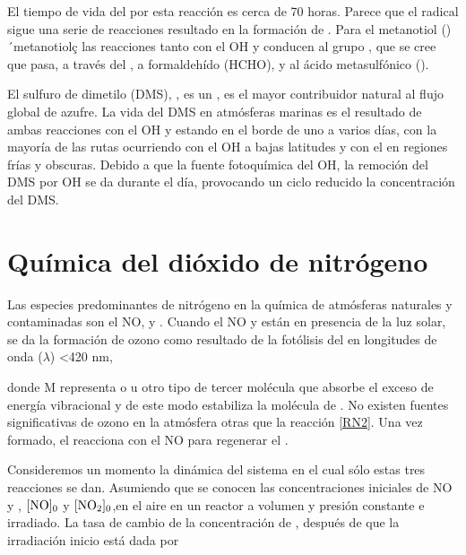 El tiempo de vida del  por esta reacción es cerca de 70 horas. Parece que el radical  sigue una serie de reacciones resultado en la formación de  . Para el metanotiol ()\index´metanotiolç las reacciones tanto con el OH y  conducen al grupo , que se cree que pasa, a través del , a formaldehído (HCHO),   y al ácido metasulfónico ().

El sulfuro de dimetilo (DMS), , es un , es el mayor contribuidor natural al flujo global de azufre. La vida del DMS en atmósferas marinas es el resultado de ambas reacciones con el OH y  estando en el borde de uno a varios días, con la mayoría de las rutas ocurriendo con el OH a bajas latitudes y con el  en regiones frías  y obscuras. Debido a que la fuente fotoquímica del OH, la remoción del DMS por OH se da durante el día, provocando un ciclo reducido la concentración del DMS.


\section{Química del dióxido de nitrógeno}
Las especies predominantes de nitrógeno en la química de atmósferas naturales y contaminadas son el NO,  y . 
Cuando el NO y   están en presencia de la luz solar, se da la formación de ozono como resultado de la fotólisis del   en longitudes de onda ($\lambda$) <420 nm,



donde M representa  o  u otro tipo de tercer molécula que absorbe el exceso de energía vibracional y de este modo estabiliza la molécula de . No existen fuentes significativas de ozono en la atmósfera otras que la reacción \ref{RN2}. Una vez formado, el  reacciona con el NO para regenerar el .


Consideremos un momento la dinámica del sistema en el cual sólo estas tres reacciones se dan. Asumiendo que se conocen las concentraciones iniciales de NO y , $[\ce{NO}]_0$ y $[\ce{NO2}]_0$,en el aire en un reactor a volumen y presión constante e irradiado. La tasa de cambio de la concentración de , después de que la irradiación inicio está dada por

